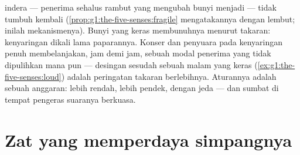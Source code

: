 \begin{proposition}\label{prop:g8:protecting-the-nervous-system:noise}
 indera  --- penerima sehalus rambut yang
mengubah bunyi menjadi  --- tidak tumbuh kembali
(\cref{prop:g1:the-five-senses:fragile} mengatakannya dengan
lembut; inilah mekanismenya). Bunyi yang keras membunuhnya
menurut takaran: kenyaringan dikali lama paparannya. Konser
dan penyuara  pada kenyaringan penuh membelanjakan,
jam demi jam, sebuah modal penerima yang tidak dipulihkan
 mana pun --- desingan sesudah sebuah malam yang keras
(\cref{ex:g1:the-five-senses:loud}) adalah peringatan
takaran berlebihnya. Aturannya adalah sebuah anggaran: lebih
rendah, lebih pendek, dengan jeda --- dan sumbat  di
tempat pengeras suaranya berkuasa.
\end{proposition}
\admitted

\section{Zat yang memperdaya simpangnya}

